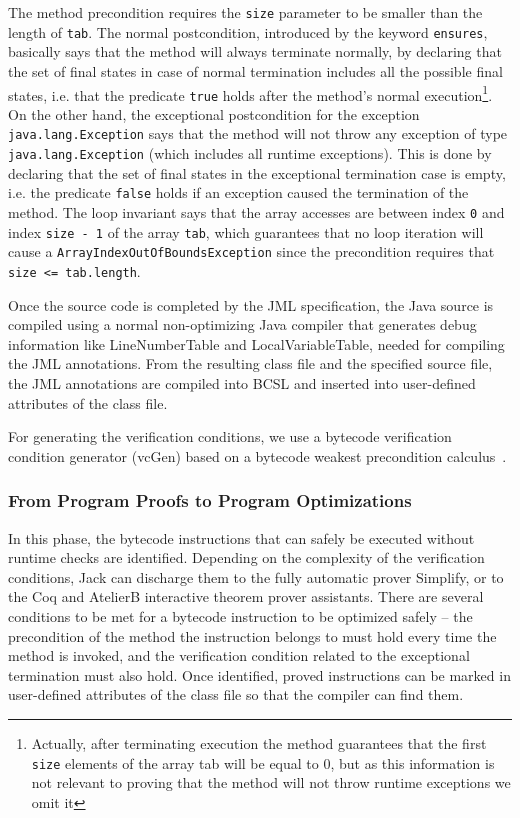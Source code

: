 The method precondition requires the \verb!size! parameter to be smaller than the length of \verb!tab!. The normal postcondition, introduced by the keyword \verb!ensures!, basically says that the method will always terminate normally, by declaring that the set of final states in case of normal termination includes all the possible final states, i.e. that the predicate \verb!true! holds after the method's normal execution\footnote{Actually, after terminating execution the method guarantees that the first \texttt{size} elements of the array tab will be equal to 0, but as this information is not relevant to proving that the method will not throw runtime exceptions we omit it}. On the other hand, the exceptional postcondition for the exception \texttt{java.lang.Exception} says that the method will not throw any exception of type \texttt{java.lang.Exception} (which includes all runtime exceptions). This is done by declaring that the set of final states in the exceptional termination case is empty, i.e. the predicate \texttt{false} holds if an exception caused the termination of the method. The loop invariant says that the array accesses are between index \verb!0! and index \verb!size - 1! of the array \verb!tab!, which guarantees that no loop iteration will cause a \verb!ArrayIndexOutOfBoundsException! since the precondition requires that \verb!size <= tab.length!.

Once the source code is completed by the JML specification, the Java source is compiled using a normal non-optimizing Java compiler that generates debug information like \textrm{LineNumberTable} and \textrm{LocalVariableTable}, needed for compiling the JML annotations. From the resulting class file and the specified source file, the JML annotations are compiled into BCSL and inserted into user-defined attributes of the class file. 

For generating the verification conditions, we use a bytecode verification condition generator (vcGen) based on a bytecode weakest precondition calculus~\cite{JBL05MP}. 

\subsubsection{From Program Proofs to Program Optimizations }
\label{proofs}
In this phase, the bytecode instructions that can safely be executed without runtime checks are identified. Depending on the complexity of the verification conditions, Jack can discharge them to the fully automatic prover Simplify, or to the Coq and AtelierB interactive theorem prover assistants.
There are several conditions to be met for a bytecode instruction to be optimized safely -- the precondition of the method the instruction belongs to must hold every time the method is invoked, and the verification condition related to the exceptional termination must also hold.
Once identified, proved instructions can be marked in user-defined attributes of the class file so that the compiler can find them.

